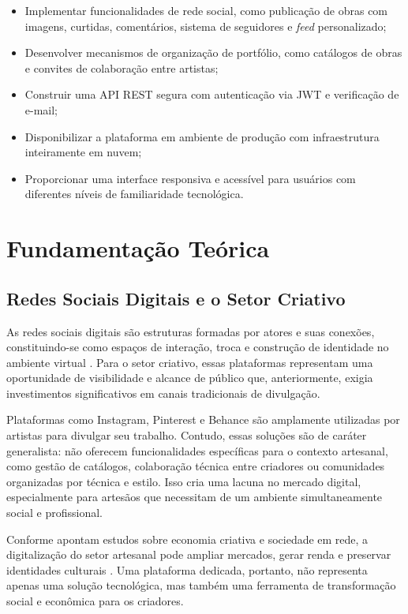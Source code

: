 \documentclass[a4paper, 12pt, oneside]{article}
\begin{document}
\begin{itemize}
    \item Implementar funcionalidades de rede social, como publicação de obras com imagens, curtidas, comentários, sistema de seguidores e \textit{feed} personalizado;
    \item Desenvolver mecanismos de organização de portfólio, como catálogos de obras e convites de colaboração entre artistas;
    \item Construir uma API REST segura com autenticação via JWT e verificação de e-mail;
    \item Disponibilizar a plataforma em ambiente de produção com infraestrutura inteiramente em nuvem;
    \item Proporcionar uma interface responsiva e acessível para usuários com diferentes níveis de familiaridade tecnológica.
\end{itemize}

\section{Fundamentação Teórica}

\subsection{Redes Sociais Digitais e o Setor Criativo}

As redes sociais digitais são estruturas formadas por atores e suas conexões, constituindo-se como espaços de interação, troca e construção de identidade no ambiente virtual \cite{recuero2009}. Para o setor criativo, essas plataformas representam uma oportunidade de visibilidade e alcance de público que, anteriormente, exigia investimentos significativos em canais tradicionais de divulgação.

Plataformas como Instagram, Pinterest e Behance são amplamente utilizadas por artistas para divulgar seu trabalho. Contudo, essas soluções são de caráter generalista: não oferecem funcionalidades específicas para o contexto artesanal, como gestão de catálogos, colaboração técnica entre criadores ou comunidades organizadas por técnica e estilo. Isso cria uma lacuna no mercado digital, especialmente para artesãos que necessitam de um ambiente simultaneamente social e profissional.

Conforme apontam estudos sobre economia criativa e sociedade em rede, a digitalização do setor artesanal pode ampliar mercados, gerar renda e preservar identidades culturais \cite{castells2003}. Uma plataforma dedicada, portanto, não representa apenas uma solução tecnológica, mas também uma ferramenta de transformação social e econômica para os criadores.
\end{document}
